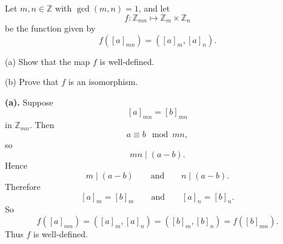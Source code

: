 \begin{problem}{
    Let $m,n\in\mathbb{Z}$ with $\gcd(m,n)=1$, and let
    \[
        f:\mathbb{Z}_{mn}\mapsto\mathbb{Z}_m\times\mathbb{Z}_n
    \]
    be the function given by
    \[
        f([a]_{mn})=([a]_m,[a]_n).
    \]

    (a) Show that the map $f$ is well-defined.

    (b) Prove that $f$ is an isomorphism.
}
    \textbf{(a).}
    Suppose
    \[
        [a]_{mn}=[b]_{mn}
    \]
    in $\mathbb{Z}_{mn}$.
    Then
    \[
        a\equiv b\mod {mn},
    \]
    so
    \[
        mn\mid (a-b).
    \]
    Hence
    \[
        m\mid (a-b)
        \qquad\text{and}\qquad
        n\mid (a-b).
    \]
    Therefore
    \[
        [a]_m=[b]_m
        \qquad\text{and}\qquad
        [a]_n=[b]_n.
    \]
    So
    \[
        f([a]_{mn})=([a]_m,[a]_n)=([b]_m,[b]_n)=f([b]_{mn}).
    \]
    Thus $f$ is well-defined.


\end{problem}
